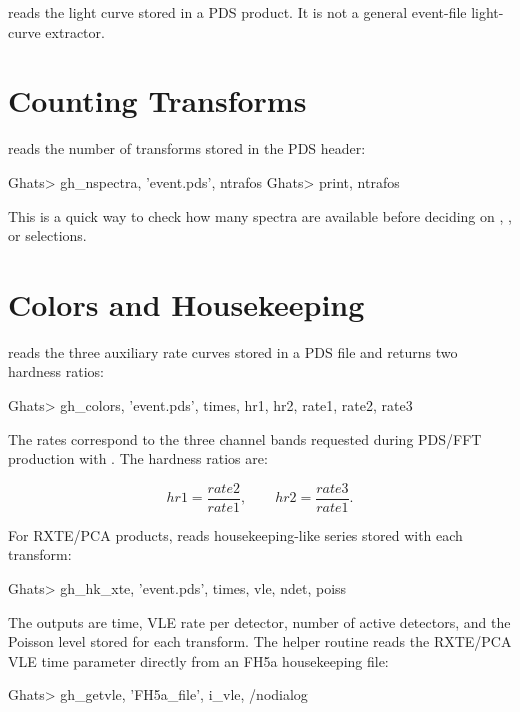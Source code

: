 \begin{ghatsnote}
 reads the light curve stored in a PDS product.  It is not a
general event-file light-curve extractor.
\end{ghatsnote}

\section{Counting Transforms}

 reads the number of transforms stored in the PDS header:

\begin{ghatsconsole}
Ghats> gh_nspectra, 'event.pds', ntrafos
Ghats> print, ntrafos
\end{ghatsconsole}

This is a quick way to check how many spectra are available before deciding on
, , or  selections.

\section{Colors and Housekeeping}

 reads the three auxiliary rate curves stored in a PDS
file and returns two hardness ratios:

\begin{ghatsconsole}
Ghats> gh_colors, 'event.pds', times, hr1, hr2, rate1, rate2, rate3
\end{ghatsconsole}

The rates correspond to the three channel bands requested during PDS/FFT
production with .  The hardness ratios are:

\[
  hr1 = \frac{rate2}{rate1}, \qquad
  hr2 = \frac{rate3}{rate1}.
\]

For RXTE/PCA products,  reads housekeeping-like series
stored with each transform:

\begin{ghatsconsole}
Ghats> gh_hk_xte, 'event.pds', times, vle, ndet, poiss
\end{ghatsconsole}

The outputs are time, VLE rate per detector, number of active detectors, and
the Poisson level stored for each transform.  The helper routine
 reads the RXTE/PCA VLE time parameter directly from an
FH5a housekeeping file:

\begin{ghatsconsole}
Ghats> gh_getvle, 'FH5a_file', i_vle, /nodialog
\end{ghatsconsole}


